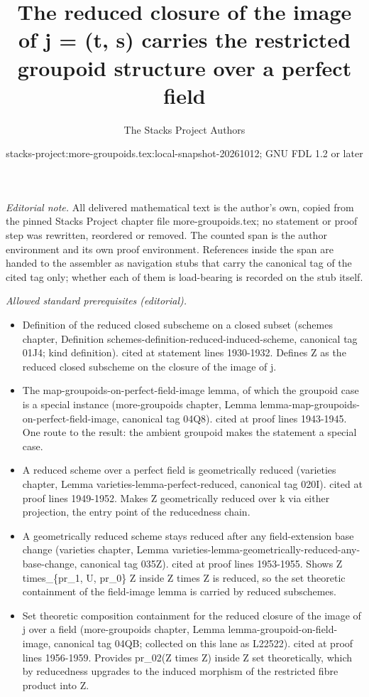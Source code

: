 \documentclass{stacks-project}
\title{The reduced closure of the image of j = (t, s) carries the restricted groupoid structure over a perfect field}
\author{The Stacks Project Authors}
\date{stacks-project:more-groupoids.tex:local-snapshot-20261012; GNU FDL 1.2 or later}
\theoremstyle{plain}
\theoremstyle{definition}
\theoremstyle{remark}
\numberwithin{equation}{subsection}
\begin{document}
\maketitle
\setcounter{subsection}{1}
\noindent\textit{Editorial note.} All delivered mathematical text is the author's own, copied from the pinned Stacks Project chapter file more-groupoids.tex; no statement or proof step was rewritten, reordered or removed. The counted span is the author environment and its own proof environment. References inside the span are handed to the assembler as navigation stubs that carry the canonical tag of the cited tag only; whether each of them is load-bearing is recorded on the stub itself.\par\medskip
\noindent\textit{Allowed standard prerequisites (editorial).}\begin{itemize}
\item Definition of the reduced closed subscheme on a closed subset (schemes chapter, Definition schemes-definition-reduced-induced-scheme, canonical tag 01J4; kind definition). cited at statement lines 1930-1932. Defines Z as the reduced closed subscheme on the closure of the image of j.
\item The map-groupoids-on-perfect-field-image lemma, of which the groupoid case is a special instance (more-groupoids chapter, Lemma lemma-map-groupoids-on-perfect-field-image, canonical tag 04Q8). cited at proof lines 1943-1945. One route to the result: the ambient groupoid makes the statement a special case.
\item A reduced scheme over a perfect field is geometrically reduced (varieties chapter, Lemma varieties-lemma-perfect-reduced, canonical tag 020I). cited at proof lines 1949-1952. Makes Z geometrically reduced over k via either projection, the entry point of the reducedness chain.
\item A geometrically reduced scheme stays reduced after any field-extension base change (varieties chapter, Lemma varieties-lemma-geometrically-reduced-any-base-change, canonical tag 035Z). cited at proof lines 1953-1955. Shows Z times\_\{pr\_1, U, pr\_0\} Z inside Z times Z is reduced, so the set theoretic containment of the field-image lemma is carried by reduced subschemes.
\item Set theoretic composition containment for the reduced closure of the image of j over a field (more-groupoids chapter, Lemma lemma-groupoid-on-field-image, canonical tag 04QB; collected on this lane as L22522). cited at proof lines 1956-1959. Provides pr\_02(Z times Z) inside Z set theoretically, which by reducedness upgrades to the induced morphism of the restricted fibre product into Z.
\end{itemize}\medskip
\end{document}
